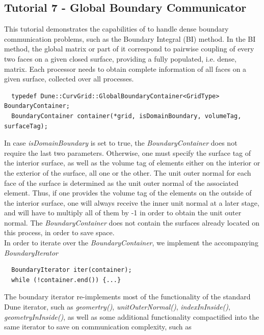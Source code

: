\subsection{Tutorial 7 - Global Boundary Communicator}

\noindent
This tutorial demonstrates the capabilities of \curvgrid{} to handle dense boundary communication problems, such as the Boundary Integral (BI) method. In the BI method, the global matrix or part of it correspond to pairwise coupling of every two faces on a given closed surface, providing a fully populated, i.e. dense, matrix. Each processor needs to obtain complete information of all faces on a given surface, collected over all processes.

\begin{mybox}
\begin{lstlisting}
  typedef Dune::CurvGrid::GlobalBoundaryContainer<GridType> BoundaryContainer;
  BoundaryContainer container(*grid, isDomainBoundary, volumeTag, surfaceTag);
\end{lstlisting}
\end{mybox}

\noindent
In case \textit{isDomainBoundary} is set to true, the \textit{BoundaryContainer} does not require the last two parameters. Otherwise, one must specify the surface tag of the interior surface, as well as the volume tag of elements either on the interior or the exterior of the surface, all one or the other. The unit outer normal for each face of the surface is determined as the unit outer normal of the associated element. Thus, if one provides the volume tag of the elements on the outside of the interior surface, one will always receive the inner unit normal at a later stage, and will have to multiply all of them by -1 in order to obtain the unit outer normal. The \textit{BoundaryContainer} does not contain the surfaces already located on this process, in order to save space.  \\

\noindent
In order to iterate over the \textit{BoundaryContainer}, we implement the accompanying \textit{BoundaryIterator}

\begin{mybox}
\begin{lstlisting}
  BoundaryIterator iter(container);
  while (!container.end()) {...}
\end{lstlisting}
\end{mybox}

\noindent
The boundary iterator re-implements most of the functionality of the standard Dune iterator, such as \textit{geomertry()}, \textit{unitOuterNormal()}, \textit{indexInInside()}, \textit{geometryInInside()}, as well as some additional functionality compactified into the same iterator to save on communication complexity, such as 

